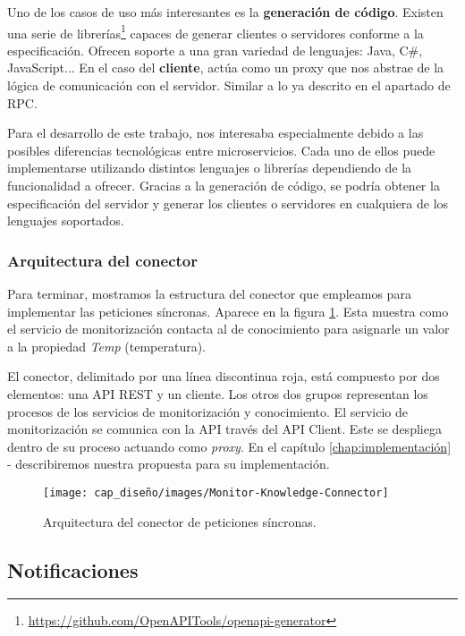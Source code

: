 Uno de los casos de uso más interesantes es la \textbf{generación de código}. Existen una serie de librerías\footnote{\url{https://github.com/OpenAPITools/openapi-generator}} capaces de generar clientes o servidores conforme a la especificación. Ofrecen soporte a una gran variedad de lenguajes: Java, C\#, JavaScript... En el caso del \textbf{cliente}, actúa como un proxy que nos abstrae de la lógica de comunicación con el servidor. Similar a lo ya descrito en el apartado de RPC.

Para el desarrollo de este trabajo, nos interesaba especialmente debido a las posibles diferencias tecnológicas entre microservicios. Cada uno de ellos puede implementarse utilizando distintos lenguajes o librerías dependiendo de la funcionalidad a ofrecer. Gracias a la generación de código, se podría obtener la especificación del servidor y generar los clientes o servidores en cualquiera de los lenguajes soportados.

\subsubsection{Arquitectura del conector}

Para terminar, mostramos la estructura del conector que empleamos para implementar las peticiones síncronas. Aparece en la figura \ref{fig:monitor-knowledge-connector-architecture}. Esta muestra como el servicio de monitorización contacta al de conocimiento para asignarle un valor a la propiedad \emph{Temp} (temperatura).

El conector, delimitado por una línea discontinua roja, está compuesto por dos elementos: una API REST y un cliente. Los otros dos grupos representan los procesos de los servicios de monitorización y conocimiento. El servicio de monitorización se comunica con la API través del API Client. Este se despliega dentro de su proceso actuando como \emph{proxy}. En el capítulo \ref{chap:implementación} -  describiremos nuestra propuesta para su implementación.

\begin{figure}[htb]
  \centering
  \texttt{[image: cap\_diseño/images/Monitor-Knowledge-Connector]}
  \caption{Arquitectura del conector de peticiones síncronas.}
  \label{fig:monitor-knowledge-connector-architecture}
\end{figure}

\subsection{Notificaciones}
\label{sec:notificaciones}

